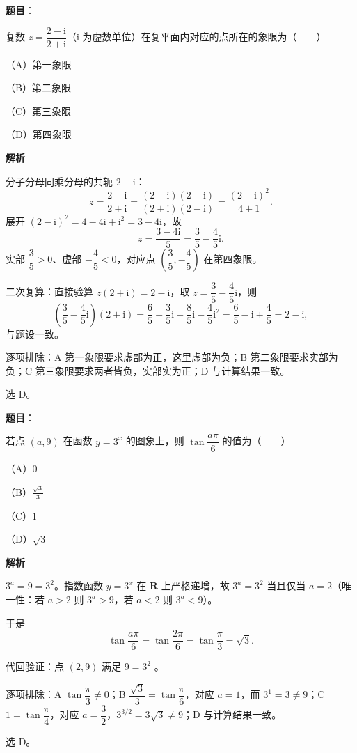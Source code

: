 \begin{answer}

\textbf{题目}：

复数 $z=\dfrac{2-\mathrm i}{2+\mathrm i}$（$\mathrm i$ 为虚数单位）在复平面内对应的点所在的象限为\mbox{（　　）}

（A）第一象限

（B）第二象限

（C）第三象限

（D）第四象限

\textbf{解析}

分子分母同乘分母的共轭 $2-\mathrm i$：
\nopagebreak[4]
\[
z=\frac{2-\mathrm i}{2+\mathrm i}=\frac{(2-\mathrm i)(2-\mathrm i)}{(2+\mathrm i)(2-\mathrm i)}=\frac{(2-\mathrm i)^2}{4+1}.
\]
展开 $(2-\mathrm i)^2=4-4\mathrm i+\mathrm i^2=3-4\mathrm i$，故
\nopagebreak[4]
\[
z=\frac{3-4\mathrm i}{5}=\frac35-\frac45\mathrm i.
\]
实部 $\dfrac35>0$、虚部 $-\dfrac45<0$，对应点 $\left(\dfrac35,-\dfrac45\right)$ 在第四象限。

二次复算：直接验算 $z(2+\mathrm i)=2-\mathrm i$，取 $z=\dfrac35-\dfrac45\mathrm i$，则
\nopagebreak[4]
\[
\left(\frac35-\frac45\mathrm i\right)(2+\mathrm i)=\frac65+\frac35\mathrm i-\frac85\mathrm i-\frac45\mathrm i^2=\frac65-\mathrm i+\frac45=2-\mathrm i,
\]
与题设一致。

逐项排除：A 第一象限要求虚部为正，这里虚部为负；B 第二象限要求实部为负；C 第三象限要求两者皆负，实部实为正；D 与计算结果一致。

选 D。


\end{answer}
\begin{answer}

\textbf{题目}：

若点 $(a,9)$ 在函数 $y=3^x$ 的图象上，则 $\tan\dfrac{a\pi}{6}$ 的值为\mbox{（　　）}

（A）$0$

（B）$\frac{\sqrt3}{3}$

（C）$1$

（D）$\sqrt3$

\textbf{解析}

$3^a=9=3^2$。指数函数 $y=3^x$ 在 $\mathbf R$ 上严格递增，故 $3^a=3^2$ 当且仅当 $a=2$（唯一性：若 $a>2$ 则 $3^a>9$，若 $a<2$ 则 $3^a<9$）。

于是
\nopagebreak[4]
\[
\tan\frac{a\pi}{6}=\tan\frac{2\pi}{6}=\tan\frac{\pi}{3}=\sqrt3.
\]

代回验证：点 $(2,9)$ 满足 $9=3^2$ 。

逐项排除：A $\tan\dfrac{\pi}{3}\neq0$；B $\dfrac{\sqrt3}{3}=\tan\dfrac{\pi}{6}$，对应 $a=1$，而 $3^1=3\neq9$；C $1=\tan\dfrac{\pi}{4}$，对应 $a=\dfrac32$，$3^{3/2}=3\sqrt3\neq9$；D 与计算结果一致。

选 D。


\end{answer}
